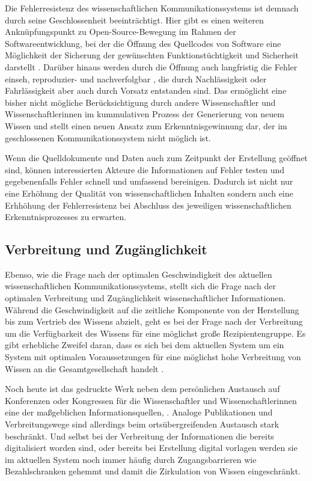 Die Fehlerresistenz des wissenschaftlichen Kommunikationssystems ist demnach durch seine Geschlossenheit beeinträchtigt. Hier gibt es einen weiteren Anknüpfungspunkt zu Open-Source-Bewegung im Rahmen der Softwareentwicklung, bei der die Öffnung des Quellcodes von Software eine Möglichkeit der Sicherung der gewünschten Funktionstüchtigkeit und Sicherheit darstellt \cite{hoepman_2007_increased}. Darüber hinaus werden durch die Öffnung auch langfristig die Fehler einseh, reproduzier- und nachverfolgbar \cite{Nosek_2015}, die durch Nachlässigkeit oder Fahrlässigkeit aber auch durch Vorsatz entstanden sind. Das ermöglicht eine bisher nicht mögliche Berücksichtigung durch andere Wissenschaftler und Wissenschaftlerinnen im kummulativen Prozess der Generierung von neuem Wissen und stellt einen neuen Ansatz zum Erkenntnisgewinnung dar, der im geschlossenen Kommunikationssystem nicht möglich ist.

Wenn die Quelldokumente und Daten auch zum Zeitpunkt der Erstellung geöffnet sind, können interessierten Akteure die Informationen auf Fehler testen und gegebenenfalls Fehler schnell und umfassend bereinigen. Dadurch ist nicht nur eine Erhöhung der Qualität von wissenschaftlichen Inhalten sondern auch eine Erhhöhung der Fehlerresistenz bei Abschluss des jeweiligen wissenschaftlichen Erkenntnisprozesses zu erwarten.

\subsection{Verbreitung und Zugänglichkeit}

Ebenso, wie die Frage nach der optimalen Geschwindigkeit des aktuellen wissenschaftlichen Kommunikationssystems, stellt sich die Frage nach der optimalen Verbreitung und Zugänglichkeit wissenschaftlicher Informationen. Während die Geschwindigkeit auf die zeitliche Komponente von der Herstellung bis zum Vertrieb des Wissens abzielt, geht es bei der Frage nach der Verbreitung um die Verfügbarkeit des Wissens für eine möglichst große Rezipientengruppe. Es gibt erhebliche Zweifel daran, dass es sich bei dem aktuellen System um ein System mit optimalen Voraussetzungen für eine möglichst hohe Verbreitung von Wissen an die Gesamtgesellschaft handelt \cite{suchen}.

Noch heute ist das gedruckte Werk neben dem persönlichen Austausch auf Konferenzen oder Kongressen \cite{winkler_2011_anforderungen} für die Wissenschaftler und Wissenschaftlerinnen eine der maßgeblichen Informationsquellen, . Analoge Publikationen und Verbreitungswege sind allerdings beim ortsübergreifenden Austausch stark beschränkt. Und selbst bei der Verbreitung der Informationen die bereits digitalisiert worden sind, oder bereits bei Erstellung digital vorlagen werden sie im aktuellen System noch immer häufig durch Zugangsbarrieren wie Bezahlschranken gehemmt und damit die Zirkulation von Wissen eingeschränkt.


